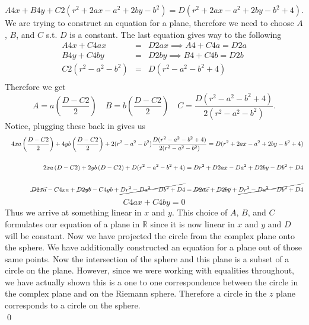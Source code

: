 \documentclass[10pt]{amsart}
\theoremstyle{nonumberplain}
\begin{document}
\begin{enumerate}[label={\bf {\arabic*}:}]
$$ A4x  + B4y + C2\left(r^2 +2ax - a^2 +2by - b^2\right) = D(r^2 +2ax - a^2 +2by - b^2 + 4).$$
We are trying to construct an equation for a plane, therefore we need to choose $A$, $B$, and $C$ s.t. $D$ is a constant.
The last equation gives way to the following
\begin{eqnarray*}
A4x + C4ax &=& D2ax \implies A4 + C4a = D2a \\ 
B4y + C4by &=& D2by \implies B4 + C4b = D2b \\
C2(r^2 - a^2 - b^2) &=& D(r^2 -a^2 - b^2 + 4) \\
\end{eqnarray*}
Therefore we get
$$A = a\left(\frac{D - C2}{2}\right) \quad B = b\left(\frac{D - C2}{2}\right) \quad C = \frac{D(r^2 -a^2 - b^2 + 4)}{2(r^2 - a^2 - b^2)}.$$
Notice, plugging these back in gives us
\begin{eqnarray*}
&& 4xa\left(\frac{D - C2}{2}\right) + 4yb\left(\frac{D - C2}{2}\right) + 2(r^2 - a^2 - b^2)\frac{D(r^2 -a^2 - b^2 + 4)}{2(r^2 - a^2 - b^2)} = D(r^2 +2ax - a^2 +2by - b^2 + 4) \\ \\
&& 2xa\left(D - C2\right) + 2yb\left(D - C2\right) + D(r^2 -a^2 - b^2 + 4) = Dr^2 + D2ax - Da^2 + D2by - Db^2 + D4 \\ \\
&& \cancel{D2xa} - C4xa + \cancel{D2yb} - C4yb + \cancel{Dr^2 -Da^2 - Db^2 + D4} = \cancel{D2ax} + \cancel{D2by} + \cancel{Dr^2 - Da^2  - Db^2 + D4}
\end{eqnarray*}
$$C4ax + C4by = 0$$
Thus we arrive at something linear in $x$ and $y$.
This choice of $A$, $B$, and $C$ formulates our equation of a plane in $\mathbb{R}$ since it is now linear in $x$ and $y$ and $D$ will be constant.
Now we have projected the circle from the complex plane onto the sphere.
We have additionally constructed an equation for a plane out of those same points.
Now the intersection of the sphere and this plane is a subset of a circle on the plane.
However, since we were working with equalities throughout, we have actually shown this is a one to one correspondence between the circle in the complex plane and on the Riemann sphere.
Therefore a circle in the $z$ plane corresponds to a circle on the sphere. \\
\qed


\end{enumerate}
\end{document}
